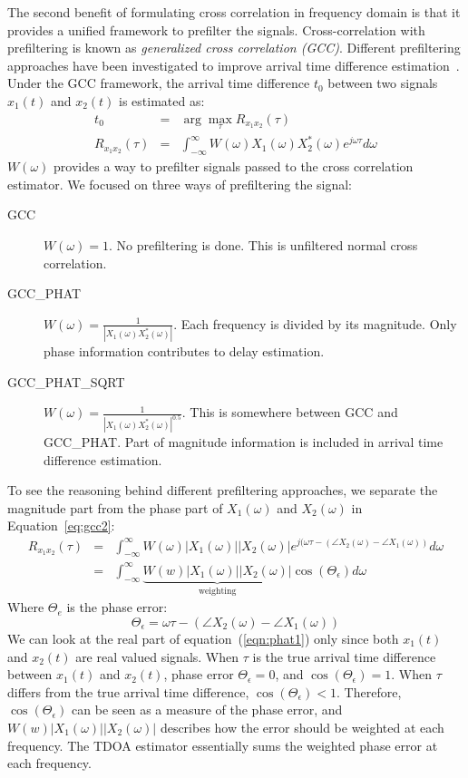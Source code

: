The second benefit of formulating cross correlation in frequency domain is that it provides a unified framework to prefilter the signals. Cross-correlation with prefiltering is known as \emph{generalized cross correlation (GCC)}. Different prefiltering approaches have been investigated to improve arrival time difference estimation~\cite{tdoa:gcc1,tdoa:gcc2,tdoa:gcc3}. Under the GCC framework, the arrival time difference $t_0$ between two signals $x_1(t)$ and $x_2(t)$ is estimated as:
\begin{eqnarray} \label{eq:gcc}
t_0 &=& \arg\max_{\tau} R_{x_1x_2}(\tau) \\\label{eq:gcc2}
R_{x_1x_2}(\tau) &=& \int_{-\infty}^\infty W(\omega) X_1(\omega) X_2^{*}(\omega) e^{j\omega\tau} d\omega
\end{eqnarray}
$W(\omega)$ provides a way to prefilter signals passed to the cross correlation estimator. We focused on three ways of prefiltering the signal:
\begin{description}%
\item[GCC] $W(\omega) = 1$. No prefiltering is done. This is unfiltered normal cross correlation.
\item[GCC\_PHAT] $W(\omega) = \frac{1}{\left|X_1(\omega)X_2^{*}(\omega)\right|}$. Each frequency is divided by its magnitude. Only phase information contributes to delay estimation.
\item[GCC\_PHAT\_SQRT] $W(\omega) = \frac{1}{\left|X_1(\omega)X_2^*(\omega)\right|^{0.5}}$. This is somewhere between GCC and GCC\_PHAT. Part of magnitude information is included in arrival time difference estimation.
\end{description}

To see the reasoning behind different prefiltering approaches, we separate the magnitude part from the phase part of $X_1(\omega)$ and $X_2(\omega)$ in Equation~\ref{eq:gcc2}:
\begin{eqnarray}
\label{eqn:phat1}
R_{x_1x_2}(\tau) &=& \int_{-\infty}^\infty W(\omega) |X_1(\omega)||X_2(\omega)| e^{j(\omega\tau - (\angle{X_2(\omega)} - \angle{X_1(\omega)}) } d\omega\\
&=& \int_{-\infty}^\infty \underbrace{W(w)|X_1(\omega)| |X_2(\omega)|}_{\mbox{weighting}} \cos(\Theta_\epsilon) d\omega
\end{eqnarray}
Where $\Theta_{e}$ is the phase error:
\[
\Theta_\epsilon = \omega\tau - (\angle X_2(\omega) - \angle X_1(\omega))
\]
We can look at the real part of equation~(\ref{eqn:phat1}) only since both $x_1(t)$ and $x_2(t)$ are real valued signals. When $\tau$ is the true arrival time difference between $x_1(t)$ and $x_2(t)$, phase error $\Theta_\epsilon  = 0$, and $\cos(\Theta_\epsilon) = 1$. When $\tau$ differs from the true arrival time difference, $\cos(\Theta_\epsilon) < 1$. Therefore, $\cos(\Theta_\epsilon)$ can be seen as a measure of the phase error, and $W(w)|X_1(\omega)||X_2(\omega)|$ describes how the error should be weighted at each frequency. The TDOA estimator essentially sums the weighted phase error at each frequency. 

